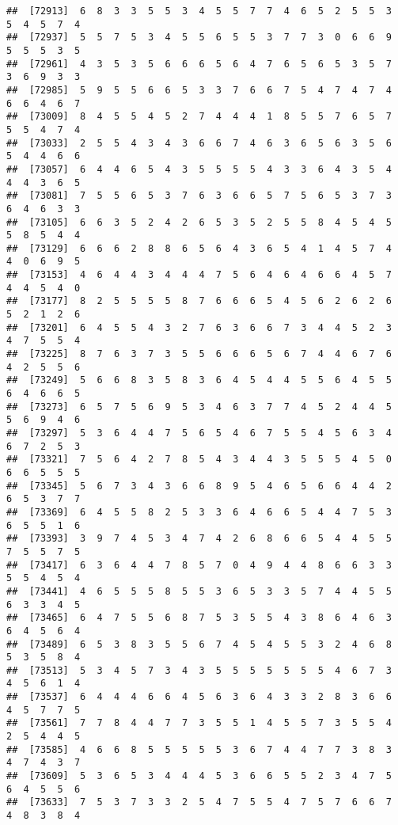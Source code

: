 \documentclass[
]{book}
\begin{document}
\begin{verbatim}
##  [72913]  6  8  3  3  5  5  3  4  5  5  7  7  4  6  5  2  5  5  3  5  4  5  7  4
##  [72937]  5  5  7  5  3  4  5  5  6  5  5  3  7  7  3  0  6  6  9  5  5  5  3  5
##  [72961]  4  3  5  3  5  6  6  6  5  6  4  7  6  5  6  5  3  5  7  3  6  9  3  3
##  [72985]  5  9  5  5  6  6  5  3  3  7  6  6  7  5  4  7  4  7  4  6  6  4  6  7
##  [73009]  8  4  5  5  4  5  2  7  4  4  4  1  8  5  5  7  6  5  7  5  5  4  7  4
##  [73033]  2  5  5  4  3  4  3  6  6  7  4  6  3  6  5  6  3  5  6  5  4  4  6  6
##  [73057]  6  4  4  6  5  4  3  5  5  5  5  4  3  3  6  4  3  5  4  4  4  3  6  5
##  [73081]  7  5  5  6  5  3  7  6  3  6  6  5  7  5  6  5  3  7  3  6  4  6  3  3
##  [73105]  6  6  3  5  2  4  2  6  5  3  5  2  5  5  8  4  5  4  5  5  8  5  4  4
##  [73129]  6  6  6  2  8  8  6  5  6  4  3  6  5  4  1  4  5  7  4  4  0  6  9  5
##  [73153]  4  6  4  4  3  4  4  4  7  5  6  4  6  4  6  6  4  5  7  4  4  5  4  0
##  [73177]  8  2  5  5  5  5  8  7  6  6  6  5  4  5  6  2  6  2  6  5  2  1  2  6
##  [73201]  6  4  5  5  4  3  2  7  6  3  6  6  7  3  4  4  5  2  3  4  7  5  5  4
##  [73225]  8  7  6  3  7  3  5  5  6  6  6  5  6  7  4  4  6  7  6  4  2  5  5  6
##  [73249]  5  6  6  8  3  5  8  3  6  4  5  4  4  5  5  6  4  5  5  6  4  6  6  5
##  [73273]  6  5  7  5  6  9  5  3  4  6  3  7  7  4  5  2  4  4  5  5  6  9  4  6
##  [73297]  5  3  6  4  4  7  5  6  5  4  6  7  5  5  4  5  6  3  4  6  7  2  5  3
##  [73321]  7  5  6  4  2  7  8  5  4  3  4  4  3  5  5  5  4  5  0  6  6  5  5  5
##  [73345]  5  6  7  3  4  3  6  6  8  9  5  4  6  5  6  6  4  4  2  6  5  3  7  7
##  [73369]  6  4  5  5  8  2  5  3  3  6  4  6  6  5  4  4  7  5  3  6  5  5  1  6
##  [73393]  3  9  7  4  5  3  4  7  4  2  6  8  6  6  5  4  4  5  5  7  5  5  7  5
##  [73417]  6  3  6  4  4  7  8  5  7  0  4  9  4  4  8  6  6  3  3  5  5  4  5  4
##  [73441]  4  6  5  5  5  8  5  5  3  6  5  3  3  5  7  4  4  5  5  6  3  3  4  5
##  [73465]  6  4  7  5  5  6  8  7  5  3  5  5  4  3  8  6  4  6  3  6  4  5  6  4
##  [73489]  6  5  3  8  3  5  5  6  7  4  5  4  5  5  3  2  4  6  8  5  3  5  8  4
##  [73513]  5  3  4  5  7  3  4  3  5  5  5  5  5  5  5  4  6  7  3  4  5  6  1  4
##  [73537]  6  4  4  4  6  6  4  5  6  3  6  4  3  3  2  8  3  6  6  4  5  7  7  5
##  [73561]  7  7  8  4  4  7  7  3  5  5  1  4  5  5  7  3  5  5  4  2  5  4  4  5
##  [73585]  4  6  6  8  5  5  5  5  5  3  6  7  4  4  7  7  3  8  3  4  7  4  3  7
##  [73609]  5  3  6  5  3  4  4  4  5  3  6  6  5  5  2  3  4  7  5  6  4  5  5  6
##  [73633]  7  5  3  7  3  3  2  5  4  7  5  5  4  7  5  7  6  6  7  4  8  3  8  4

\end{verbatim}
\end{document}
